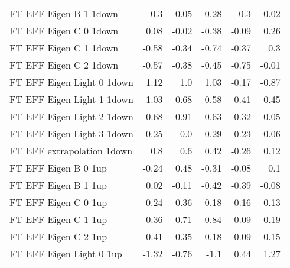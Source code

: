 \begin{table}[htbp]
{\begin{tabular}{lrrrrr}
FT EFF Eigen B 1  1down      & 0.3              & 0.05               & 0.28               & -0.3               & -0.02              \\
FT EFF Eigen C 0  1down      & 0.08             & -0.02              & -0.38              & -0.09              & 0.26               \\
FT EFF Eigen C 1  1down      & -0.58            & -0.34              & -0.74              & -0.37              & 0.3                \\
FT EFF Eigen C 2  1down      & -0.57            & -0.38              & -0.45              & -0.75              & -0.01              \\
FT EFF Eigen Light 0  1down  & 1.12             & 1.0                & 1.03               & -0.17              & -0.87              \\
FT EFF Eigen Light 1  1down  & 1.03             & 0.68               & 0.58               & -0.41              & -0.45              \\
FT EFF Eigen Light 2  1down  & 0.68             & -0.91              & -0.63              & -0.32              & 0.05               \\
FT EFF Eigen Light 3  1down  & -0.25            & 0.0                & -0.29              & -0.23              & -0.06              \\
FT EFF extrapolation  1down    & 0.8              & 0.6                & 0.42               & -0.26              & 0.12               \\
FT EFF Eigen B 0  1up        & -0.24            & 0.48               & -0.31              & -0.08              & 0.1                \\
FT EFF Eigen B 1  1up        & 0.02             & -0.11              & -0.42              & -0.39              & -0.08              \\
FT EFF Eigen C 0  1up        & -0.24            & 0.36               & 0.18               & -0.16              & -0.13              \\
FT EFF Eigen C 1  1up        & 0.36             & 0.71               & 0.84               & 0.09               & -0.19              \\
FT EFF Eigen C 2  1up        & 0.41             & 0.35               & 0.18               & -0.09              & -0.15              \\
FT EFF Eigen Light 0  1up    & -1.32            & -0.76              & -1.1               & 0.44               & 1.27               \\

\end{tabular}}
\end{table}
